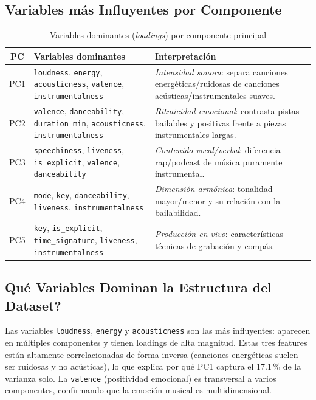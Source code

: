 \documentclass[12pt,a4paper]{article}
\begin{document}
\subsection{Variables m\'as Influyentes por Componente}

\begin{table}[H]
\centering
\caption{Variables dominantes (\textit{loadings}) por componente principal}
\small
\begin{tabular}{clp{7.5cm}}
\toprule
\textbf{PC} & \textbf{Variables dominantes} & \textbf{Interpretaci\'on} \\
\midrule
PC1 &
  \texttt{loudness}, \texttt{energy}, \texttt{acousticness},
  \texttt{valence}, \texttt{instrumentalness} &
  \emph{Intensidad sonora}: separa canciones energ\'eticas/ruidosas de
  canciones ac\'usticas/instrumentales suaves. \\[5pt]
PC2 &
  \texttt{valence}, \texttt{danceability}, \texttt{duration\_min},
  \texttt{acousticness}, \texttt{instrumentalness} &
  \emph{Ritmicidad emocional}: contrasta pistas bailables y positivas
  frente a piezas instrumentales largas. \\[5pt]
PC3 &
  \texttt{speechiness}, \texttt{liveness}, \texttt{is\_explicit},
  \texttt{valence}, \texttt{danceability} &
  \emph{Contenido vocal/verbal}: diferencia rap/podcast de m\'usica
  puramente instrumental. \\[5pt]
PC4 &
  \texttt{mode}, \texttt{key}, \texttt{danceability},
  \texttt{liveness}, \texttt{instrumentalness} &
  \emph{Dimensi\'on arm\'onica}: tonalidad mayor/menor y su relaci\'on
  con la bailabilidad. \\[5pt]
PC5 &
  \texttt{key}, \texttt{is\_explicit}, \texttt{time\_signature},
  \texttt{liveness}, \texttt{instrumentalness} &
  \emph{Producci\'on en vivo}: caracter\'isticas t\'ecnicas de grabaci\'on
  y comp\'as. \\
\bottomrule
\end{tabular}
\end{table}

\subsection{\textquestiondown Qu\'e Variables Dominan la Estructura del Dataset?}

Las variables \texttt{loudness}, \texttt{energy} y \texttt{acousticness} son las m\'as
influyentes: aparecen en m\'ultiples componentes y tienen loadings de alta magnitud.
Estas tres features est\'an altamente correlacionadas de forma inversa (canciones
energ\'eticas suelen ser ruidosas y no ac\'usticas), lo que explica por qu\'e PC1 captura
el 17.1\,\% de la varianza solo. La \texttt{valence} (positividad emocional) es transversal
a varios componentes, confirmando que la emoci\'on musical es multidimensional.
\end{document}
